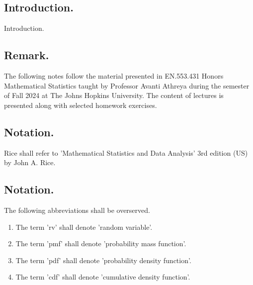 \documentclass[titlepage]{article}
\begin{document}
\maketitle

\tableofcontents

\newpage {}

\subsection{Introduction.} Introduction.

\subsection{Remark.} The following notes follow the material presented in EN.553.431 Honors Mathematical Statistics taught by Professor Avanti Athreya during the semester of Fall 2024 at The Johns Hopkins University. The content of lectures is presented along with selected homework exercises.

\subsection{Notation.} Rice shall refer to 'Mathematical Statistics and Data Analysis' 3rd edition (US) by John A. Rice.

\subsection{Notation.} The following abbreviations shall be overserved.
\begin{enumerate}
\item The term 'rv' shall denote 'random variable'.
\item The term 'pmf' shall denote 'probability mass function'.
\item The term 'pdf' shall denote 'probability density function'.
\item The term 'cdf' shall denote 'cumulative density function'.
\end{enumerate}
\end{document}
